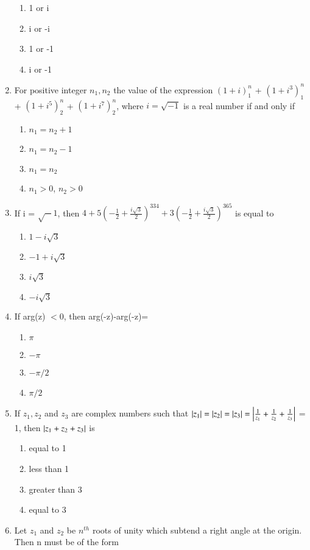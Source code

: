 \begin{enumerate}[label=\arabic*.,ref=\thesubsection.\theenumi]
   \begin{enumerate} 
    \item 1 or i
    \item  i or -i
    \item  1 or -1
    \item  i or -1
    \end{enumerate}
    \item For positive integer $n_1, n_2$ the value of the expression
    $(1+i)^n_1$ + $(1+i^3)^n_1$ + $(1+i^5)^n_2$ + $(1+i^7)^n_2$, where $i = \sqrt{-1}$ is a real number if and only if
    \begin{enumerate}
    \item  $n_1=n_2+1$
    \item  $n_1=n_2-1$
    \item  $n_1=n_2$
    \item  $n_1 > 0$, $n_2 > 0$
    \end{enumerate}
    \item If i = $\sqrt -1$, then $4+5(-\frac{1}{2}+\frac{i\sqrt3}{2})^{334}+3(-\frac{1}{2}+\frac{i\sqrt3}{2})^{365}$ is equal to 
    \begin{enumerate}
    \item  $1-i\sqrt 3$
    \item  $-1+i\sqrt 3$
    \item  $i\sqrt 3$
    \item  $-i\sqrt 3$
    \end{enumerate}
    \item If arg(z) $< 0$, then arg(-z)-arg(-z)=
    \begin{enumerate}
    \item  $\pi$
    \item  $-\pi$
    \item  $-\pi/2$
    \item  $\pi/2$
    \end{enumerate}
    \item If $z_1, z_2$ and $z_3$ are complex numbers such that 
    $\left\vert z_1\right\vert =\left\vert z_2\right\vert = \left\vert z_3\right\vert = \left\vert \frac{1}{z_1}+\frac{1}{z_2}+\frac{1}{z_3}\right\vert$ = 1, 
    then $\left\vert z_1 + z_2 + z_3\right\vert$ is 
   \begin{enumerate} 
    \item  equal to 1
    \item  less than 1
    \item  greater than 3
    \item  equal to 3
    \end{enumerate}
    \item Let $z_1$ and $z_2$ be $n^{th}$ roots of unity which subtend a right angle at the origin. Then n must be of the form

\end{enumerate}
